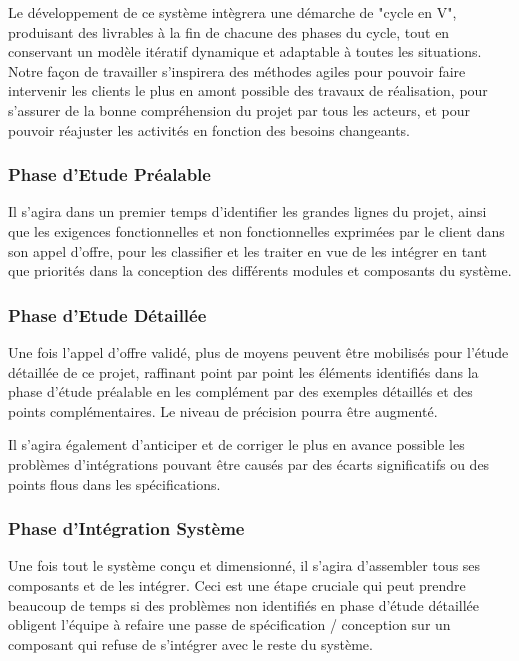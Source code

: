 \documentclass[a4paper]{article}
\begin{document}
Le développement de ce système intègrera une démarche de "cycle en V", produisant des livrables à la fin de chacune des phases du cycle, tout en conservant un modèle itératif dynamique et adaptable à toutes les situations. Notre façon de travailler s'inspirera des méthodes agiles pour pouvoir faire intervenir les clients le plus en amont possible des travaux de réalisation, pour s'assurer de la bonne compréhension du projet par tous les acteurs, et pour pouvoir réajuster les activités en fonction des besoins changeants.

\subsubsection{Phase d'Etude Préalable}

Il s'agira dans un premier temps d'identifier les grandes lignes du projet, ainsi que les exigences fonctionnelles et non fonctionnelles exprimées par le client dans son appel d'offre, pour les classifier et les traiter en vue de les intégrer en tant que priorités dans la conception des différents modules et composants du système.

\subsubsection{Phase d'Etude Détaillée}

Une fois l'appel d'offre validé, plus de moyens peuvent être mobilisés pour l'étude détaillée de ce projet, raffinant point par point les éléments identifiés dans la phase d'étude préalable en les complément par des exemples détaillés et des points complémentaires. Le niveau de précision pourra être augmenté.

Il s'agira également d'anticiper et de corriger le plus en avance possible les problèmes d'intégrations pouvant être causés par des écarts significatifs ou des points flous dans les spécifications.

\subsubsection{Phase d'Intégration Système}

Une fois tout le système conçu et dimensionné, il s'agira d'assembler tous ses composants et de les intégrer. Ceci est une étape cruciale qui peut prendre beaucoup de temps si des problèmes non identifiés en phase d'étude détaillée obligent l'équipe à refaire une passe de spécification / conception sur un composant qui refuse de s'intégrer avec le reste du système.
\end{document}
